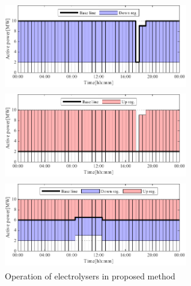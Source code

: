 \documentclass[fleqn]{ieej}
\begin{document}
\begin{figure}[t]%
  \begin{center}
    \begin{minipage}{8cm}
      \begin{center}
      \setlength{\abovecaptionskip}{0mm} %
      \setlength{\belowcaptionskip}{0mm} %
      \includegraphics[width=8cm,height=3.8cm]{proposed_method_E1.pdf}  
    \end{center}
    \end{minipage}
 
    \begin{minipage}{8cm}
      \begin{center}
      \setlength{\abovecaptionskip}{0mm} %
      \setlength{\belowcaptionskip}{0mm} %
      \includegraphics[width=8cm,height=3.8cm]{proposed_method_E2.pdf}  
    \end{center}
    \end{minipage}

  
  \caption{Operation of electrolysers in proposed method}\label{fig:proposed}
  

  \begin{minipage}{8cm}
    \begin{center}
    \setlength{\abovecaptionskip}{0mm} %
    \setlength{\belowcaptionskip}{0mm} %
    \includegraphics[width=8cm,height=3.8cm]{uniformity_shedule.pdf}  
  \end{center}
  \end{minipage}



\end{center}
\end{figure}
\end{document}
